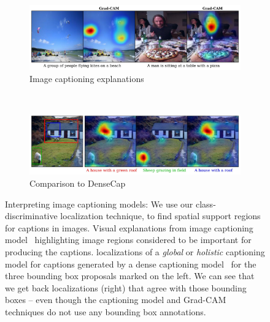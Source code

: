 \begin{figure}[ht!]
    \centering
  \begin{subfigure}[t]{0.49\textwidth}
    \includegraphics[width=\textwidth]{figures/captioning_main.jpg}
    \caption{\scriptsize{Image captioning explanations}}
  \label{fig:captioning}
  \end{subfigure}
  ~
    \begin{subfigure}[t]{0.49\textwidth}
    \includegraphics[width=\textwidth]{figures/densecap_main.jpg}
    \caption{\scriptsize{Comparison to DenseCap}}
   \label{fig:densecap}
   \end{subfigure}
   \vspace{14pt}
    \caption{Interpreting image captioning models: We use our class-discriminative localization technique, \gcam{} to find spatial support regions for captions in images.  Visual explanations from image captioning model~\cite{karpathy2015deep} highlighting image regions considered to be important for producing the captions.  \gcam{} localizations of a \emph{global} or \emph{holistic} captioning model for captions generated by a dense
    captioning model~\cite{johnson_cvpr16} for the three bounding box proposals marked on the left. We can see that we get back \gcam{} localizations (right) that agree with those bounding boxes -- even though the captioning model and Grad-CAM techniques do not use any bounding box annotations.}
\end{figure}


